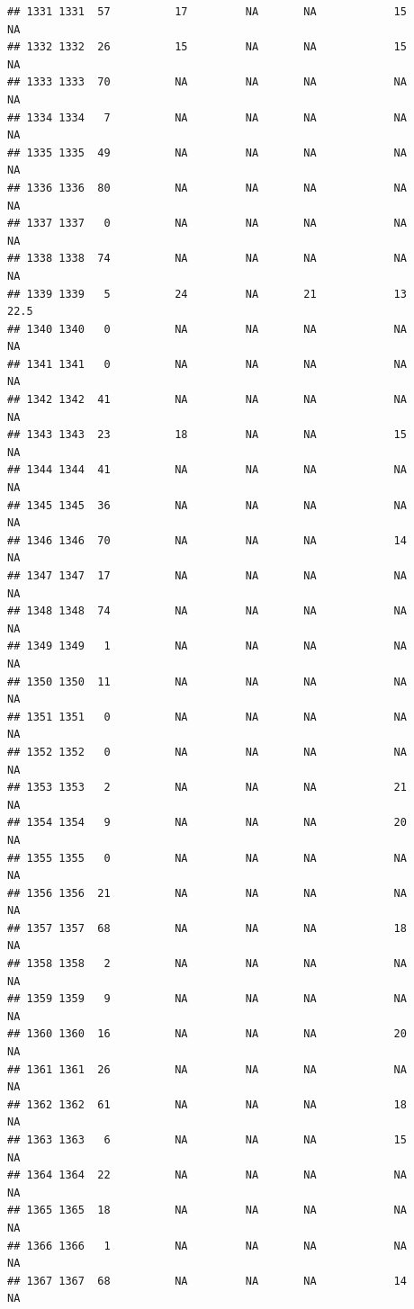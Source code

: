 \documentclass[man]{apa6}
\begin{document}
\begin{verbatim}
## 1331 1331  57          17         NA       NA            15       NA
## 1332 1332  26          15         NA       NA            15       NA
## 1333 1333  70          NA         NA       NA            NA       NA
## 1334 1334   7          NA         NA       NA            NA       NA
## 1335 1335  49          NA         NA       NA            NA       NA
## 1336 1336  80          NA         NA       NA            NA       NA
## 1337 1337   0          NA         NA       NA            NA       NA
## 1338 1338  74          NA         NA       NA            NA       NA
## 1339 1339   5          24         NA       21            13     22.5
## 1340 1340   0          NA         NA       NA            NA       NA
## 1341 1341   0          NA         NA       NA            NA       NA
## 1342 1342  41          NA         NA       NA            NA       NA
## 1343 1343  23          18         NA       NA            15       NA
## 1344 1344  41          NA         NA       NA            NA       NA
## 1345 1345  36          NA         NA       NA            NA       NA
## 1346 1346  70          NA         NA       NA            14       NA
## 1347 1347  17          NA         NA       NA            NA       NA
## 1348 1348  74          NA         NA       NA            NA       NA
## 1349 1349   1          NA         NA       NA            NA       NA
## 1350 1350  11          NA         NA       NA            NA       NA
## 1351 1351   0          NA         NA       NA            NA       NA
## 1352 1352   0          NA         NA       NA            NA       NA
## 1353 1353   2          NA         NA       NA            21       NA
## 1354 1354   9          NA         NA       NA            20       NA
## 1355 1355   0          NA         NA       NA            NA       NA
## 1356 1356  21          NA         NA       NA            NA       NA
## 1357 1357  68          NA         NA       NA            18       NA
## 1358 1358   2          NA         NA       NA            NA       NA
## 1359 1359   9          NA         NA       NA            NA       NA
## 1360 1360  16          NA         NA       NA            20       NA
## 1361 1361  26          NA         NA       NA            NA       NA
## 1362 1362  61          NA         NA       NA            18       NA
## 1363 1363   6          NA         NA       NA            15       NA
## 1364 1364  22          NA         NA       NA            NA       NA
## 1365 1365  18          NA         NA       NA            NA       NA
## 1366 1366   1          NA         NA       NA            NA       NA
## 1367 1367  68          NA         NA       NA            14       NA

\end{verbatim}
\end{document}
